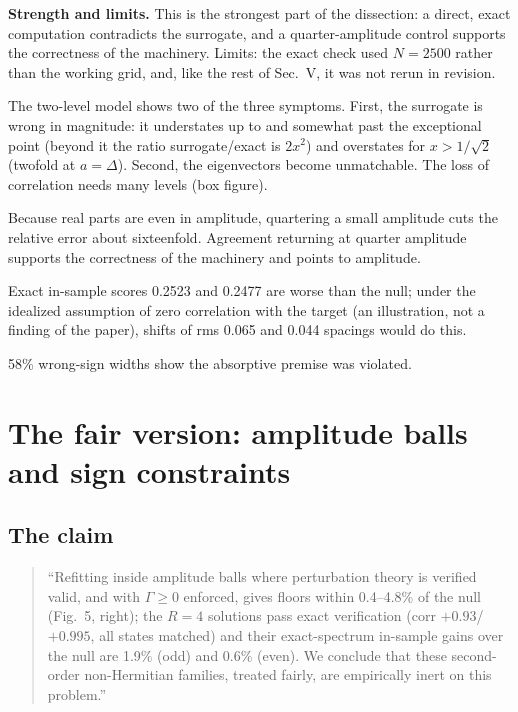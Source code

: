 \textbf{Strength and limits.} This is the strongest part of the dissection: a direct, exact computation contradicts the surrogate, and a quarter-amplitude control supports the correctness of the machinery. Limits: the exact check used $N=2500$ rather than the working grid, and, like the rest of Sec.~V, it was not rerun in revision.

\begin{keyideas}
\item The two-level model shows two of the three symptoms. First, the surrogate is wrong in magnitude: it understates up to and somewhat past the exceptional point (beyond it the ratio surrogate/exact is $2x^2$) and overstates for $x>1/\sqrt2$ (twofold at $a=\Delta$). Second, the eigenvectors become unmatchable. The loss of correlation needs many levels (box figure).
\item Because real parts are even in amplitude, quartering a small amplitude cuts the relative error about sixteenfold. Agreement returning at quarter amplitude supports the correctness of the machinery and points to amplitude.
\item Exact in-sample scores 0.2523 and 0.2477 are worse than the null; under the idealized assumption of zero correlation with the target (an illustration, not a finding of the paper), shifts of rms 0.065 and 0.044 spacings would do this.
\item 58\% wrong-sign widths show the absorptive premise was violated.
\end{keyideas}

\section{The fair version: amplitude balls and sign constraints}\label{sec:paper-spurious-floor-fair}

\subsection{The claim}

\begin{quote}
``Refitting inside amplitude balls where perturbation theory is verified valid, and with $\Gamma\ge0$ enforced, gives floors within 0.4--4.8\% of the null (Fig.~5, right); the $R=4$ solutions pass exact verification (corr $+0.93$/$+0.995$, all states matched) and their exact-spectrum in-sample gains over the null are 1.9\% (odd) and 0.6\% (even). We conclude that these second-order non-Hermitian families, treated fairly, are empirically inert on this problem.''
\end{quote}

